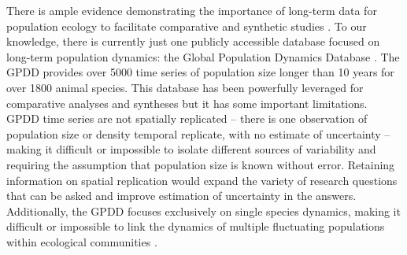 \documentclass{article}\usepackage[]{graphicx}\usepackage[]{color}
\begin{document}
There is ample evidence demonstrating the importance of long-term data for population ecology to facilitate comparative and synthetic studies \citep{Lindenmayer2012,Giron-Nava2017}. To our knowledge, there is currently just one publicly accessible database focused on long-term population dynamics: the Global Population Dynamics Database \citep[GPDD,][]{Inchausti2001}. The GPDD provides over 5000 time series of population size longer than 10 years for over 1800 animal species. This database has been powerfully leveraged for comparative analyses and syntheses \citep[e.g.,][]{Knape2012} but it has some important limitations. GPDD time series are not spatially replicated – there is one observation of population size or density temporal replicate, with no estimate of uncertainty – making it difficult or impossible to isolate different sources of variability and requiring the assumption that population size is known without error. Retaining information on spatial replication would expand the variety of research questions that can be asked and improve estimation of uncertainty in the answers. Additionally, the GPDD focuses exclusively on single species dynamics, making it difficult or impossible to link the dynamics of multiple fluctuating populations within ecological communities \citep[e.g.,][]{Ushio2018}.  
\end{document}
